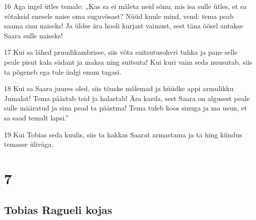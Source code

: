\par 16 Aga ingel ütles temale: „Kas sa ei mäleta neid sõnu, mis isa  sulle ütles, et sa võtaksid enesele naise oma suguvõsast? Nüüd  kuule mind, vend: tema peab saama sinu naiseks! Ja üldse ära hooli  kurjast vaimust, sest täna öösel antakse Saara sulle naiseks!
\par 17 Kui sa lähed pruudikambrisse, siis võta suitsutusohvri tuhka ja  pane selle peale pisut kala südant ja maksa ning suitsuta! Kui kuri  vaim seda nuusutab, siis ta põgeneb ega tule iialgi enam tagasi.
\par 18 Kui sa Saara juures oled, siis tõuske mõlemad ja hüüdke appi  armulikku Jumalat! Tema päästab teid ja halastab! Ära karda, sest  Saara on algusest peale sulle määratud ja sina pead ta päästma! Tema  tuleb koos sinuga ja ma usun, et sa saad temalt lapsi.”
\par 19 Kui Tobias seda kuulis, siis ta hakkas Saarat armastama ja ta  hing kiindus temasse üliväga.

\chapter{7}

\section*{Tobias Ragueli kojas}

